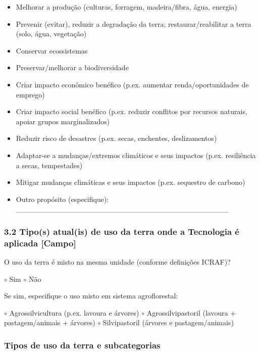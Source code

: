 \begin{itemize}
\tightlist
\item[$\square$]
  Melhorar a produção (culturas, forragem, madeira/fibra, água, energia)
\item[$\square$]
  Prevenir (evitar), reduzir a degradação da terra; restaurar/reabilitar a terra (solo, água, vegetação)
\item[$\square$]
  Conservar ecossistemas
\item[$\square$]
  Preservar/melhorar a biodiversidade
\item[$\square$]
  Criar impacto econômico benéfico (p.ex. aumentar renda/oportunidades de emprego)
\item[$\square$]
  Criar impacto social benéfico (p.ex. reduzir conflitos por recursos naturais, apoiar grupos marginalizados)
\item[$\square$]
  Reduzir risco de desastres (p.ex. secas, enchentes, deslizamentos)
\item[$\square$]
  Adaptar-se a mudanças/extremos climáticos e seus impactos (p.ex. resiliência a secas, tempestades)
\item[$\square$]
  Mitigar mudanças climáticas e seus impactos (p.ex. sequestro de carbono)
\item[$\square$]
  Outro propósito (especifique): \_\_\_\_\_\_\_\_\_\_\_\_\_\_\_\_\_\_\_\_\_\_\_\_\_\_\_\_\_\_\_\_\_\_\_\_\_\_\_\_
\end{itemize}

\subsubsection{3.2 Tipo(s) atual(is) de uso da terra onde a Tecnologia é aplicada {[Campo]}}\label{tipos-atualis-de-uso-da-terra-onde-a-tecnologia-uxe9-aplicada}

O uso da terra é misto na mesma unidade (conforme definições ICRAF)?

$\circ$ Sim $\circ$ Não

Se sim, especifique o uso misto em sistema agroflorestal:

$\circ$ Agrossilvicultura (p.ex. lavoura e árvores) $\circ$ Agrossilvipastoril (lavoura + pastagem/animais + árvores) $\circ$ Silvipastoril (árvores e pastagem/animais)

\subsubsection{Tipos de uso da terra e subcategorias}\label{tipos-de-uso-da-terra-e-subcategorias}


